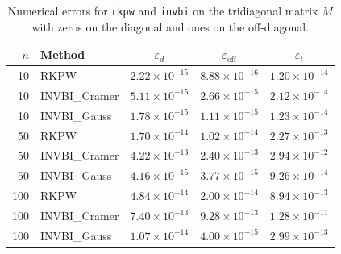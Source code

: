 \begin{table}
\caption{Numerical errors for \texttt{rkpw} and \texttt{invbi} on the tridiagonal matrix $M$ with zeros on the diagonal and ones on the off-diagonal.}
\label{tab:errors}
\begin{tabular}{rlccc}
\toprule
$n$ & Method & $\varepsilon_d$ & $\varepsilon_{\mathrm{off}}$ & $\varepsilon_t$ \\
\midrule
10 & RKPW & $2.22 \times 10^{-15}$ & $8.88 \times 10^{-16}$ & $1.20 \times 10^{-14}$ \\
10 & INVBI_Cramer & $5.11 \times 10^{-15}$ & $2.66 \times 10^{-15}$ & $2.12 \times 10^{-14}$ \\
10 & INVBI_Gauss & $1.78 \times 10^{-15}$ & $1.11 \times 10^{-15}$ & $1.23 \times 10^{-14}$ \\
50 & RKPW & $1.70 \times 10^{-14}$ & $1.02 \times 10^{-14}$ & $2.27 \times 10^{-13}$ \\
50 & INVBI_Cramer & $4.22 \times 10^{-13}$ & $2.40 \times 10^{-13}$ & $2.94 \times 10^{-12}$ \\
50 & INVBI_Gauss & $4.16 \times 10^{-15}$ & $3.77 \times 10^{-15}$ & $9.26 \times 10^{-14}$ \\
100 & RKPW & $4.84 \times 10^{-14}$ & $2.00 \times 10^{-14}$ & $8.94 \times 10^{-13}$ \\
100 & INVBI_Cramer & $7.40 \times 10^{-13}$ & $9.28 \times 10^{-13}$ & $1.28 \times 10^{-11}$ \\
100 & INVBI_Gauss & $1.07 \times 10^{-14}$ & $4.00 \times 10^{-15}$ & $2.99 \times 10^{-13}$ \\
\bottomrule
\end{tabular}
\end{table}
